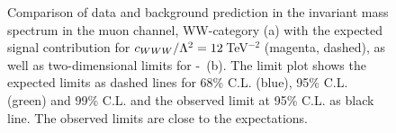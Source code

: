 \begin{figure}
    \centering
    \resizebox{\columnwidth}{!}
    {%
    \caption[Comparison of data and background prediction as well as two-dimensional limits for \Tccw -\Tcb]{Comparison of data and background prediction in the invariant mass spectrum in the muon channel, WW-category (a) with the expected signal contribution for $c_{WWW}/\Lambda^2=12$\,TeV$^{-2}$ (magenta, dashed), as well as two-dimensional limits for \Tccw -\Tcb \ (b). The limit plot shows the expected limits as dashed lines for 68\% C.L. (blue), 95\% C.L. (green) and 99\% C.L. and the observed limit at 95\% C.L. as black line. The observed limits are close to the expectations.}
    \label{fig:conclusion}
    }
\end{figure}